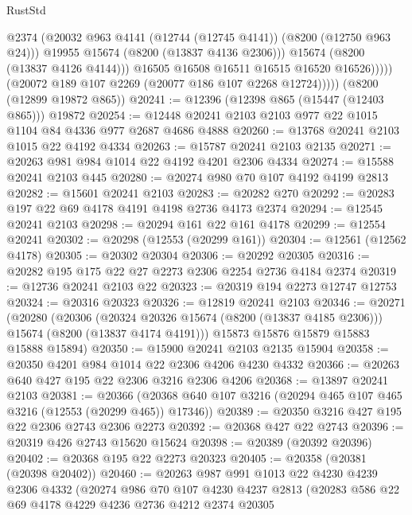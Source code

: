 \begin{lexlean}{RustStd}
\begin{coremodule}
                        @2374
                        (@20032 @963 @4141 (@12744 (@12745 @4141)) (@8200 (@12750 @963 @24)))
                        @19955
                        @15674
                        (@8200 (@13837 @4136 @2306)))
                      @15674
                      (@8200 (@13837 @4126 @4144)))
                    @16505
                    @16508
                    @16511
                    @16515
                    @16520
                    @16526)))))
          (@20072 @189 @107 @2269 (@20077 @186 @107 @2268 @12724)))))
    (@8200 (@12899 @19872 @865))
@20241 := @12396 (@12398 @865 (@15447 (@12403 @865))) @19872
@20254 := @12448 @20241 @2103 @2103 @977 @22 @1015 @1104 @84 @4336 @977 @2687 @4686 @4888
@20260 := @13768 @20241 @2103 @1015 @22 @4192 @4334
@20263 := @15787 @20241 @2103 @2135
@20271 := @20263 @981 @984 @1014 @22 @4192 @4201 @2306 @4334
@20274 := @15588 @20241 @2103 @445
@20280 := @20274 @980 @70 @107 @4192 @4199 @2813
@20282 := @15601 @20241 @2103
@20283 := @20282 @270
@20292 := @20283 @197 @22 @69 @4178 @4191 @4198 @2736 @4173 @2374
@20294 := @12545 @20241 @2103
@20298 := @20294 @161 @22 @161 @4178
@20299 := @12554 @20241
@20302 := @20298 (@12553 (@20299 @161))
@20304 := @12561 (@12562 @4178)
@20305 := @20302 @20304
@20306 := @20292 @20305
@20316 := @20282 @195 @175 @22 @27 @2273 @2306 @2254 @2736 @4184 @2374
@20319 := @12736 @20241 @2103 @22
@20323 := @20319 @194 @2273 @12747 @12753
@20324 := @20316 @20323
@20326 := @12819 @20241 @2103
@20346 := @20271
    (@20280
      (@20306
        (@20324 @20326 @15674 (@8200 (@13837 @4185 @2306)))
        @15674
        (@8200 (@13837 @4174 @4191)))
      @15873
      @15876
      @15879
      @15883
      @15888
      @15894)
@20350 := @15900 @20241 @2103 @2135 @15904
@20358 := @20350 @4201 @984 @1014 @22 @2306 @4206 @4230 @4332
@20366 := @20263 @640 @427 @195 @22 @2306 @3216 @2306 @4206
@20368 := @13897 @20241 @2103
@20381 := @20366
    (@20368 @640 @107 @3216 (@20294 @465 @107 @465 @3216 (@12553 (@20299 @465)) @17346))
@20389 := @20350 @3216 @427 @195 @22 @2306 @2743 @2306 @2273
@20392 := @20368 @427 @22 @2743
@20396 := @20319 @426 @2743 @15620 @15624
@20398 := @20389 (@20392 @20396)
@20402 := @20368 @195 @22 @2273 @20323
@20405 := @20358 (@20381 (@20398 @20402))
@20460 := @20263
    @987
    @991
    @1013
    @22
    @4230
    @4239
    @2306
    @4332
    (@20274
      @986
      @70
      @107
      @4230
      @4237
      @2813
      (@20283
        @586
        @22
        @69
        @4178
        @4229
        @4236
        @2736
        @4212
        @2374
        @20305

\end{coremodule}
\end{lexlean}
